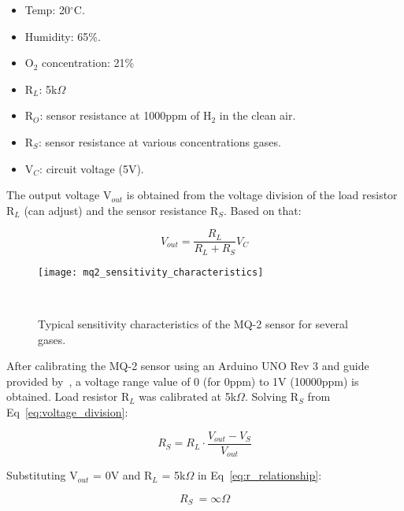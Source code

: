 \begin{itemize}
    \item Temp: 20$^{\circ}$C.

    \item Humidity: 65\%.

    \item O$_{2}$ concentration: 21\%

    \item R$_{L}$: 5k$\Omega$

    \item R$_{O}$: sensor resistance at 1000ppm of H$_{2}$ in the clean air.

    \item R$_{S}$: sensor resistance at various concentrations gases.

    \item V$_{C}$: circuit voltage (5V). \\
\end{itemize}

The output voltage V$_{out}$ is obtained from the voltage division of the load resistor R$_{L}$ (can adjust) and the sensor resistance R$_{S}$. Based on that:

\begin{equation}
    V_{out} = \frac{R_{L}}{R_{L} + R_{S}} V_{C}
    \label{eq:voltage_division}
\end{equation}

\begin{figure}[H]
    \centering
    \texttt{[image: mq2\_sensitivity\_characteristics]}
    \caption{Typical sensitivity characteristics of the MQ-2 sensor for several gases.}
~\label{fig:mq2_sensitivity_characteristics}
\end{figure}

After calibrating the MQ-2 sensor using an Arduino UNO Rev 3 and guide provided by~\cite{grove_2023}, a voltage range value of 0 (for 0ppm) to 1V (10000ppm) is obtained. Load resistor R$_{L}$ was calibrated at 5k$\Omega$. Solving R$_{S}$ from Eq~\ref{eq:voltage_division}:

\begin{equation}
    R_{S} = R_{L} \cdot \frac{V_{out} - V_{S}}{V_{out}}
    \label{eq:r_relationship}
\end{equation}

Substituting V$_{out}$ = 0V and R$_{L}$ = 5k$\Omega$ in Eq~\ref{eq:r_relationship}:

\begin{equation}
    R_{S} ~= \infty \Omega
    \label{eq:rs_at_0v}
\end{equation}

